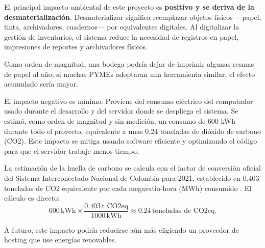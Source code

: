 


El principal impacto ambiental de este proyecto es \textbf{positivo y se deriva de la desmaterialización}. Desmaterializar significa reemplazar objetos físicos ---papel, tinta, archivadores, cuadernos--- por equivalentes digitales. Al digitalizar la gestión de inventarios, el sistema reduce la necesidad de registros en papel, impresiones de reportes y archivadores físicos.

Como orden de magnitud, una bodega podría dejar de imprimir algunas resmas de papel al año; si muchas PYMEs adoptaran una herramienta similar, el efecto acumulado sería mayor.

El impacto negativo es mínimo. Proviene del consumo eléctrico del computador usado durante el desarrollo y del servidor donde se despliega el sistema. Se estimó, como orden de magnitud y sin medición, un consumo de 600 kWh durante todo el proyecto, equivalente a unas 0.24 toneladas de dióxido de carbono (CO2). Este impacto se mitiga usando software eficiente y optimizando el código para que el servidor trabaje menos tiempo.

La estimación de la huella de carbono se calcula con el factor de conversión oficial del Sistema Interconectado Nacional de Colombia para 2021, establecido en 0.403 toneladas de CO2 equivalente por cada megavatio-hora (MWh) consumido \cite{upme_factor_emision_2021}. El cálculo es directo:
$$ 600\,\text{kWh} \times \frac{0.403\,\text{t CO2eq}}{1000\,\text{kWh}} \approx 0.24\,\text{toneladas de CO2eq.} $$

A futuro, este impacto podría reducirse aún más eligiendo un proveedor de hosting que use energías renovables.

